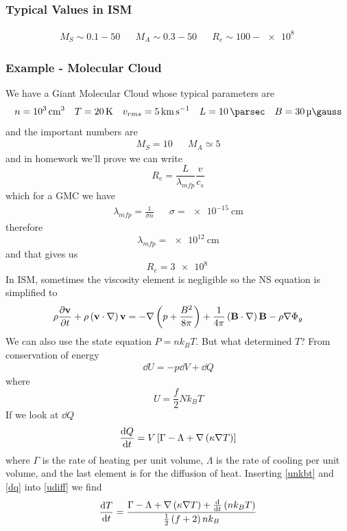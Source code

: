 \subsubsection{Typical Values in ISM}
\begin{align}
    M_S \sim 0.1 - 50 && M_A \sim 0.3 - 50 && R_e \sim 100 - \qty{e8}{}
\end{align}
\subsubsection{Example - Molecular Cloud}
We have a Giant Molecular Cloud whose typical parameters are
\begin{align}
    n = \qty{e3}{\per\centi\meter^3} && T = \qty{20}{\kelvin} && v_{rms} = \qty{5}{\kilo\meter\per\second} && L = \qty{10}{\parsec} && B = \qty{30}{\micro\gauss}
\end{align} 
and the important numbers are
\begin{align}
    M_S = 10 && M_A \simeq 5
\end{align}
and in homework we'll prove we can write 
\begin{equation}
    R_e = \frac{L}{\lambda_{mfp}}\frac{v}{c_s}
\end{equation}
which for a GMC we have
\begin{align}
    \lambda_{mfp} = \frac{1}{\sigma n} && \sigma = \qty{e-15}{\centi\meter}
\end{align}
therefore
\begin{equation}
    \lambda_{mfp} = \qty{e12}{\centi\meter}
\end{equation}
and that gives us
\begin{equation}
    R_e = \qty{3e8}{}
\end{equation}
In ISM, sometimes the viscosity element is negligible so the NS equation is simplified to
\begin{equation}
    \rho\diffp{\vec{v}}{t}+\rho\ins{\vec{v}\cdot\nabla}\vec{v} = -\nabla\ins{p+\frac{B^2}{8\pi}}+\frac{1}{4\pi}\ins{\vec{B}\cdot\nabla}\vec{B}-\rho\nabla\Phi_g
\end{equation}
We can also use the state equation \(P=nk_B T\). But what determined \(T\)? From conservation of energy
\begin{align}\label{udiff}
    \dd U = -p\dd V + \dd Q
\end{align}
where
\begin{equation}\label{unkbt}
    U = \frac{f}{2}Nk_B T
\end{equation}
If we look at \(\dd Q\)
\begin{equation}\label{dq}
    \diff{Q}{t} = V\left[\Gamma-\Lambda+\nabla\ins{\kappa\nabla T}\right]
\end{equation}
where \(\Gamma\) is the rate of heating per unit volume, \(\Lambda\) is the rate of cooling per unit volume, and the last element is for the diffusion of heat. Inserting \ref{unkbt} and \ref{dq} into \ref{udiff} we find
\begin{equation}
    \diff{T}{t} = \frac{\Gamma - \Lambda + \nabla\ins{\kappa\nabla T}+\diff*{\ins{nk_B T}}{t}}{\frac{1}{2}\ins{f+2}nk_B}
\end{equation}

